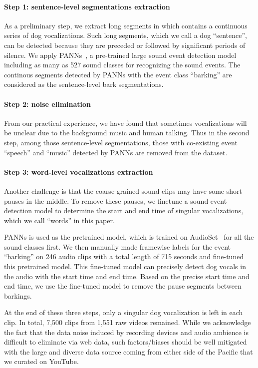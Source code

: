 \paragraph{Step 1: sentence-level segmentations extraction}
As a preliminary step, we extract long segments in which contains a continuous series of
dog vocalizations. Such long segments, which we call a dog ``sentence'', can be detected because
they are preceded or followed by significant periods of silence. 
We apply PANNs~\cite{kong2020panns}, a pre-trained large sound 
event detection model including as many as 527 sound classes for recognizing the 
sound events. The continous segments detected by PANNs with the event class ``barking'' are considered as the sentence-level bark segmentations.
\paragraph{Step 2: noise elimination}
From our practical experience, we have found that sometimes vocalizations will be unclear 
due to the background music and human talking. Thus in the second step, 
among those sentence-level segmentations, those with co-existing event ``speech'' and 
``music'' detected by PANNs are removed from the dataset.

\paragraph{Step 3: word-level vocalizations extraction}
Another challenge is that the coarse-grained sound clips may have 
some short pauses in the middle. To remove 
these pauses, we finetune a sound event detection model to 
determine the start and end time of singular vocalizations, which we call ``words'' 
in this paper.

PANNs is used as the pretrained model, which is trained on AudioSet~\cite{gemmeke2017audio} for all the sound classes first. 
We then manually made framewise labels for the event ``barking'' on 246 audio clips with a total length of 715 seconds and fine-tuned this pretrained model.
This fine-tuned model can precisely detect dog vocals in the audio with the start time and end time. Based on the precise start time and end time, we use the fine-tuned model to remove the pause segments between barkings.  

At the end of these three steps, only a singular dog vocalization is left in each clip. 
In total, 7,500 clips from 1,551 raw videos remained. While we acknowledge the fact that the data noise induced by recording devices and audio ambience is difficult to eliminate via web data, such factors/biases should be well mitigated with the large and diverse data source coming from either side of the Pacific that we curated on YouTube.

